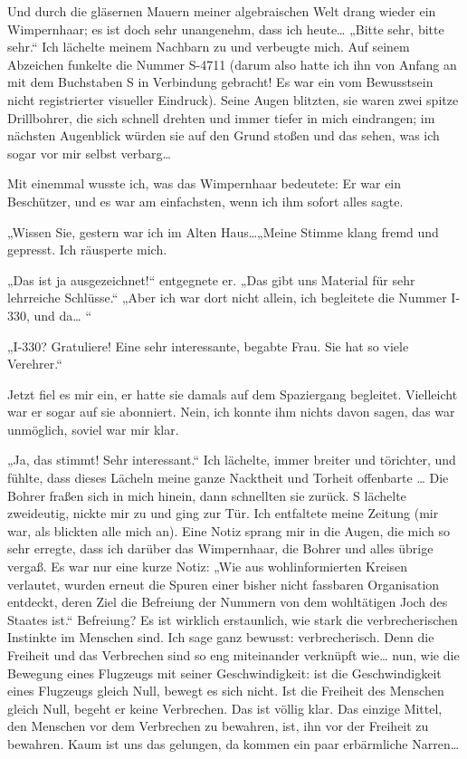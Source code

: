 Und durch die gläsernen Mauern meiner algebraischen Welt drang
wieder ein Wimpernhaar; es ist doch sehr unangenehm, dass ich
heute\ldots{} „Bitte sehr, bitte sehr.“ Ich lächelte meinem Nachbarn
zu und verbeugte mich. Auf seinem Abzeichen funkelte die Nummer
S-4711 (darum also hatte ich ihn von Anfang an mit dem Buchstaben S
in Verbindung gebracht! Es war ein vom Bewusstsein nicht
registrierter visueller Eindruck). Seine Augen blitzten, sie waren
zwei spitze Drillbohrer, die sich schnell drehten und immer tiefer
in mich eindrangen; im nächsten Augenblick würden sie auf den Grund
stoßen und das sehen, was ich sogar vor mir selbst verbarg\ldots{}

Mit einemmal wusste ich, was das Wimpernhaar bedeutete: Er war ein
Beschützer, und es war am einfachsten, wenn ich ihm sofort alles
sagte.

„Wissen Sie, gestern war ich im Alten Haus\ldots{}„Meine Stimme klang
fremd und gepresst. Ich räusperte mich.

„Das ist ja ausgezeichnet!“ entgegnete er. „Das gibt uns Material
für sehr lehrreiche Schlüsse.“ „Aber ich war dort nicht allein, ich
begleitete die Nummer I-330, und da\ldots{} “

„I-330? Gratuliere! Eine sehr interessante, begabte Frau. Sie hat
so viele Verehrer.“

Jetzt fiel es mir ein, er hatte sie damals auf dem Spaziergang
begleitet. Vielleicht war er sogar auf sie abonniert. Nein, ich
konnte ihm nichts davon sagen, das war unmöglich, soviel war mir
klar.

„Ja, das stimmt! Sehr interessant.“ Ich lächelte, immer breiter und
törichter, und fühlte, dass dieses Lächeln meine ganze Nacktheit
und Torheit offenbarte \ldots{} Die Bohrer fraßen sich in mich hinein,
dann schnellten sie zurück. S lächelte zweideutig, nickte mir zu
und ging zur Tür. Ich entfaltete meine Zeitung (mir war, als
blickten alle mich an). Eine Notiz sprang mir in die Augen, die
mich so sehr erregte, dass ich darüber das Wimpernhaar, die Bohrer
und alles übrige vergaß. Es war nur eine kurze Notiz: „Wie aus
wohlinformierten Kreisen verlautet, wurden erneut die Spuren einer
bisher nicht fassbaren Organisation entdeckt, deren Ziel die
Befreiung der Nummern von dem wohltätigen Joch des Staates ist.“
Befreiung? Es ist wirklich erstaunlich, wie stark die
verbrecherischen Instinkte im Menschen sind. Ich sage ganz bewusst:
verbrecherisch. Denn die Freiheit und das Verbrechen sind so eng
miteinander verknüpft wie\ldots{} nun, wie die Bewegung eines Flugzeugs
mit seiner Geschwindigkeit: ist die Geschwindigkeit eines Flugzeugs
gleich Null, bewegt es sich nicht. Ist die Freiheit des Menschen
gleich Null, begeht er keine Verbrechen. Das ist völlig klar. Das
einzige Mittel, den Menschen vor dem Verbrechen zu bewahren, ist,
ihn vor der Freiheit zu bewahren. Kaum ist uns das gelungen, da
kommen ein paar erbärmliche Narren\ldots{}

